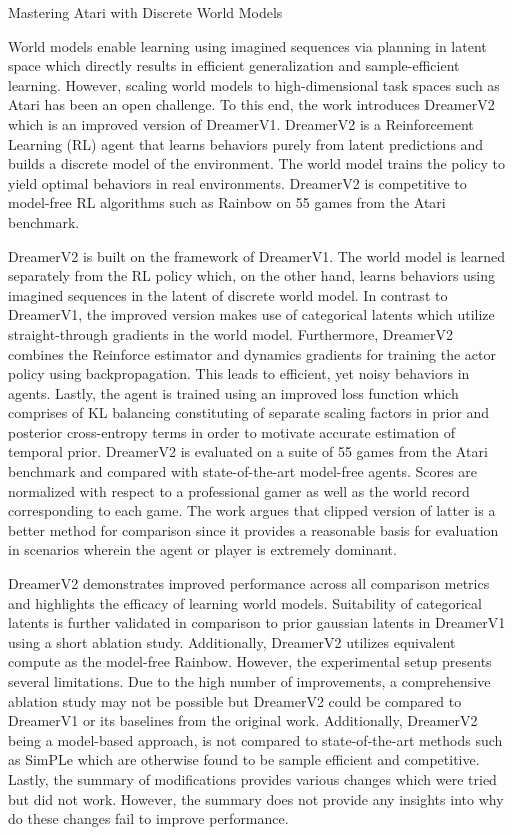 \documentclass[11pt,letterpaper]{article}
\begin{document}
\begin{center}
  \large{Mastering Atari with Discrete World Models}
\end{center}
World models enable learning using imagined sequences via planning in latent space which directly results in efficient generalization and sample-efficient learning. However, scaling world models to high-dimensional task spaces such as Atari has been an open challenge. To this end, the work introduces DreamerV2 which is an improved version of DreamerV1. DreamerV2 is a Reinforcement Learning (RL) agent that learns behaviors purely from latent predictions and builds a discrete model of the environment. The world model trains the policy to yield optimal behaviors in real environments. DreamerV2 is competitive to model-free RL algorithms such as Rainbow on 55 games from the Atari benchmark.

DreamerV2 is built on the framework of DreamerV1. The world model is learned separately from the RL policy which, on the other hand, learns behaviors using imagined sequences in the latent of discrete world model. In contrast to DreamerV1, the improved version makes use of categorical latents which utilize straight-through gradients in the world model. Furthermore, DreamerV2 combines the Reinforce estimator and dynamics gradients for training the actor policy using backpropagation. This leads to efficient, yet noisy behaviors in agents. Lastly, the agent is trained using an improved loss function which comprises of KL balancing constituting of separate scaling factors in prior and posterior cross-entropy terms in order to motivate accurate estimation of temporal prior. DreamerV2 is evaluated on a suite of 55 games from the Atari benchmark and compared with state-of-the-art model-free agents. Scores are normalized with respect to a professional gamer as well as the world record corresponding to each game. The work argues that clipped version of latter is a better method for comparison since it provides a reasonable basis for evaluation in scenarios wherein the agent or player is extremely dominant.

DreamerV2 demonstrates improved performance across all comparison metrics and highlights the efficacy of learning world models. Suitability of categorical latents is further validated in comparison to prior gaussian latents in DreamerV1 using a short ablation study. Additionally, DreamerV2 utilizes equivalent compute as the model-free Rainbow. However, the experimental setup presents several limitations. Due to the high number of improvements, a comprehensive ablation study may not be possible but DreamerV2 could be compared to DreamerV1 or its baselines from the original work. Additionally, DreamerV2 being a model-based approach, is not compared to state-of-the-art methods such as SimPLe which are otherwise found to be sample efficient and competitive. Lastly, the summary of modifications provides various changes which were tried but did not work. However, the summary does not provide any insights into why do these changes fail to improve performance. 
\end{document}
